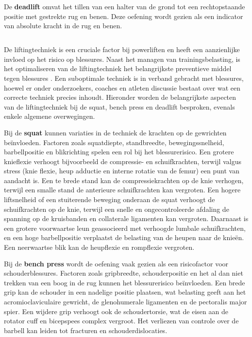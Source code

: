 \medskip

De \textbf{deadlift} omvat het tillen van een halter van de grond tot een rechtopstaande positie met gestrekte rug en benen. 
Deze oefening wordt gezien als een indicator van absolute kracht in de rug en benen.

\subsection{}%
\label{subsec:verkeerde-liftingtechniek}

De liftingtechniek is een cruciale factor bij powerliften en heeft een aanzienlijke invloed op het risico op blessures. 
Naast het managen van trainingsbelasting, is het optimaliseren van de liftingtechniek het belangrijkste preventieve middel tegen blessures \autocite{StrömbäckEtAl2018}.
Een suboptimale techniek is in verband gebracht met blessures, hoewel er onder onderzoekers, coaches en atleten discussie bestaat over wat een correcte techniek precies inhoudt. 
Hieronder worden de belangrijkste aspecten van de liftingtechniek bij de squat, bench press en deadlift besproken, evenals enkele algemene overwegingen.

\medskip

Bij de \textbf{squat} kunnen variaties in de techniek de krachten op de gewrichten beïnvloeden. 
Factoren zoals squatdiepte, standbreedte, bewegingssnelheid, barbellpositie en blikrichting spelen een rol bij het blessurerisico. 
Een grotere knieflexie verhoogt bijvoorbeeld de compressie- en schuifkrachten, terwijl valgus stress (knie flexie, heup adductie en interne rotatie van de femur) een punt van aandacht is. 
Een te brede stand kan de compressiekrachten op de knie verhogen, terwijl een smalle stand de anterieure schuifkrachten kan vergroten. 
Een hogere liftsnelheid of een stuiterende beweging onderaan de squat verhoogt de schuifkrachten op de knie, terwijl een snelle en ongecontroleerde afdaling de spanning op de kruisbanden en collaterale ligamenten kan vergroten. 
Daarnaast is een grotere voorwaartse leun geassocieerd met verhoogde lumbale schuifkrachten, en een hoge barbellpositie verplaatst de belasting van de heupen naar de knieën. 
Een neerwaartse blik kan de heupflexie en rompflexie vergroten.

\medskip

Bij de \textbf{bench press} wordt de oefening vaak gezien als een risicofactor voor schouderblessures. 
Factoren zoals gripbreedte, schouderpositie en het al dan niet trekken van een boog in de rug kunnen het blessurerisico beïnvloeden. 
Een brede grip kan de schouder in een nadelige positie plaatsen, wat belasting geeft aan het acromioclaviculaire gewricht, de glenohumerale ligamenten en de pectoralis major spier. 
Een wijdere grip verhoogt ook de schoudertorsie, wat de eisen aan de rotator cuff en bicepspees complex vergroot. 
Het verliezen van controle over de barbell kan leiden tot fracturen en schouderdislocaties.

